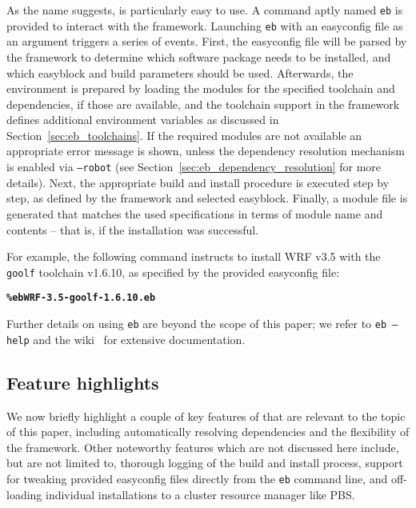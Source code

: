 As the name suggests, \easybuild{} is particularly easy to use. A command aptly named
\texttt{\small eb} is provided to interact with the \easybuild{} framework.
Launching \texttt{\small eb} with an easyconfig file as an argument triggers a
series of events. First, the easyconfig file will be parsed by the \easybuild{}
framework to determine which software package needs to be installed, and which
easyblock and build parameters should be used. Afterwards, the environment is
prepared by loading the modules for the specified toolchain and dependencies, if
those are available, and the toolchain support in the framework defines additional
environment variables as discussed in Section~\ref{sec:eb_toolchains}. If the
required modules are not available an appropriate error message is shown, unless
the dependency resolution mechanism is enabled via \texttt{\small --robot} (see
Section~\ref{sec:eb_dependency_resolution} for more details). Next,
the appropriate build and install procedure is executed step by step, as defined by
the framework and selected easyblock. Finally, a module file is generated that
matches the used specifications in terms of module name and contents -- that is,
if the installation was successful.

For example, the following command instructs \easybuild{} to install WRF v3.5
with the \texttt{\small goolf} toolchain v1.6.10, as specified by the provided easyconfig
file:

{\small
\begin{alltt}
    \textbf{\% eb WRF-3.5-goolf-1.6.10.eb}
\end{alltt}
}
\noindent
Further details on using \texttt{\small eb} are beyond the scope of this paper; we refer
to \texttt{\small eb --help} and the \easybuild{} wiki~\cite{ebwiki} for extensive
documentation.

\subsection{Feature highlights}
\label{sec:eb_features}

We now briefly highlight a couple of key features of \easybuild{} that are relevant
to the topic of this paper, including automatically resolving dependencies and
the flexibility of the \easybuild{} framework. Other noteworthy features which are
not discussed here include, but are not limited to, thorough logging of the build
and install process, support for tweaking provided easyconfig files directly from
the \texttt{\small eb} command line, and off-loading individual installations to
a cluster resource manager like PBS.

